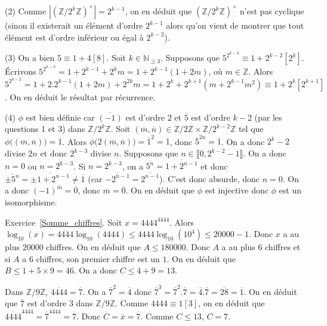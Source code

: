 \documentclass[11pt,a4paper]{article}
\newcommand{\N}{\mathbb{N}}
\newcommand{\Z}{\mathbb{Z}}
\begin{document}
(2) Comme $|(\Z/2^k\Z)^\times|=2^{k-1}$, on en déduit que $(\Z/2^k\Z)^\times$ n'est pas cyclique (sinon il existerait un élément d'ordre $2^{k-1}$ alors qu'on vient de montrer que tout élément est d'ordre inférieur ou égal à $2^{k-2}$). 


(3) On a bien $5\equiv 1+4[8]$. Soit $k\in \N_{\geq 3}$. Supposons que $5^{2^{k-3}}\equiv 1+2^{k-2} [2^k]$. Écrivons $5^{2^{k-3}}=1+2^{k-1}+2^km=1+2^{k-1}(1+2m)$, où $m\in \Z$. Alors $5^{2^{k-2}}=1+2.2^{k-1}(1+2m)+2^{2k}m=1+2^k+2^{k+1}(m+2^{k-1}m^2)\equiv 1+2^k[2^{k+1}]$. On en déduit le résultat par récurrence.

(4) $\phi$ est bien définie car  $\overline{(-1)}$ est d'ordre $2$ et $\overline{5}$ est d'ordre $k-2$ (par les questions 1 et 3) dans $\Z/2^{k}\Z$. Soit $(\overline{m},\overline{n})\in \Z/2\Z\times \Z/2^{k-2}\Z$ tel que $\phi\big((\overline{m},\overline{n})\big)=\overline{1}$. Alors $\phi\big(2(\overline{m},\overline{n})\big)=\overline{1}^2=\overline{1}$, donc $\overline{5}^{2n}=\overline{1}$. On a donc $2^{k}-2$ divise $2n$ et donc $2^{k-3}$ divise $n$. Supposons que $n\in \llbracket 0,2^{k-2}-1\rrbracket$. On a donc $n=0$ ou $n=2^{k-3}$. Si $n=2^{k-3}$, on a $\overline{5^n}=\overline{1+2^{n-1}}$ et donc $\overline{\pm 5^{n}}=\overline{\pm 1+2^{n-1}}\neq \overline{1}$ (car $\overline{-2^{n-1}}=\overline{2^{n-1}}$). C'est donc absurde, donc $n=0$. On a donc $(-1)^{\overline{m}}=\overline{0}$, donc $\overline{m}=\overline{0}$. On en déduit que $\phi$ est injective donc $\phi$ est un isomorphisme.





Exercice~\ref{Somme_chiffres}. Soit $x=4444^{4444}$. Alors $\log_{10}(x)=4444\log_{10}(4444)\leq 4444\log_{10}(10^4)\leq 20 000-1$. Donc $x$ a au plus $20000$ chiffres. On en déduit que $A\leq 180000$. Donc $A$ a au plus $6$ chiffres et si $A$ a $6$ chiffres, son premier chiffre est un $1$. On en déduit que $B\leq 1+5\times 9=46$. On a donc $C\leq 4+9=13$. 

Dans $\Z/9\Z$, $\overline{4444}=\overline{7}$. On a $\overline{7}^2=\overline{4}$ donc $\overline{7}^3=\overline{7}^2.\overline{7}=\overline{4}.\overline{7}=\overline{28}=\overline{1}$. On en déduit que $\overline{7}$ est d'ordre $3$ dans $\Z/9\Z$. Comme $4444\equiv 1[3]$, on en déduit que $\overline{4444}^{4444}=\overline{7}^{4444}=\overline{7}$. Donc $\overline{C}=\overline{x}=\overline{7}$. Comme $C\leq 13$, $C=7$.
\end{document}
